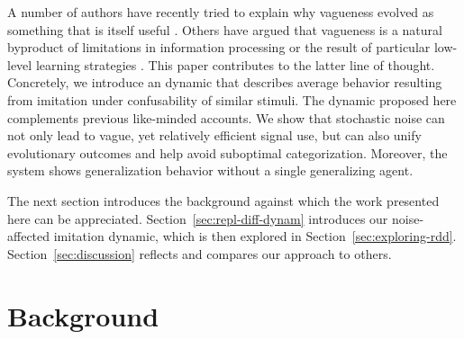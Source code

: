 \documentclass[fleqn,reqno,10pt]{article}
\begin{document}
A number of authors have recently tried to explain why vagueness evolved as something that is
itself useful
\citep[e.g.][]{Jaegherde-Jaegher2003:A-Game-Theoreti,Deemter2009:Utility-and-Lan,BlumeBoard2013:Intentional-Vag}.
Others have argued that vagueness is a natural byproduct of limitations in information
processing \citep[e.g.][]{FrankeJager2010:Vagueness-Signa} or the result of particular
low-level learning strategies \citep[e.g.][]{OConnor2013:The-Evolution-o}. This paper
contributes to the latter line of thought. Concretely, we introduce an dynamic that describes
average behavior resulting from imitation under confusability of similar stimuli. The dynamic
proposed here complements previous like-minded accounts. We show that stochastic noise can not
only lead to vague, yet relatively efficient signal use, but can also unify evolutionary
outcomes and help avoid suboptimal categorization. Moreover, the system shows generalization
behavior without a single generalizing agent.

The next section introduces the background against which the work presented here can be
appreciated. Section~\ref{sec:repl-diff-dynam} introduces our noise-affected imitation dynamic,
which is then explored in Section~\ref{sec:exploring-rdd}.  Section~\ref{sec:discussion}
reflects and compares our approach to others. %

\section{Background}
\label{sec:background}

\end{document}
